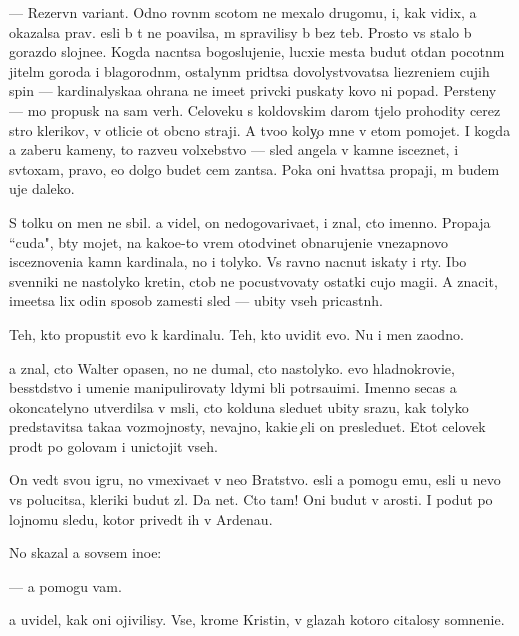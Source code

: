 \documentclass[10pt]{book}
\begin{document}
— Rezervn{\yi}{\y} variant. Odno rovn{\yi}m scotom ne mexalo drugomu, i, kak vidix, {\y}a okazalsa prav. {\Y}esli b{\yi} t{\yi} ne po{\y}avilsa, m{\yi} spravilisy b{\yi} bez teb{\ia}. Prosto vs{\e} stalo b{\yi} gorazdo slojne{\y}e. Kogda nacn{\e}tsa bogoslujeni{\y}e, lucxi{\y}e mesta budut otdan{\yi} pocotn{\yi}m jitel{\ia}m go\-ro\-da i blagorodn{\yi}m, ostalyn{\yi}m prid{\e}tsa dovolystvovatsa li\-{\c}e\-zre\-ni\-{\y}em cujih spin — kardinalyska{\y}a ohrana ne ime{\y}et priv{\yi}cki puskaty kovo ni popad{\ia}. Persteny — mo{\y} propusk na sam{\yi}{\y} verh. Celoveku s koldovskim darom t{\ia}jelo prohodity cerez stro{\y} klerikov, v otlici{\y}e ot ob{\yi}cno{\y} straji. A tvo{\y}o koly{\c}o mne v etom pomojet. I kogda {\y}a zaberu kameny, to razve{\y}u volxebstvo — sled angela v kamne isceznet, i sv{\ia}toxam, pravo, {\y}e{\x}o dolgo budet cem zan{\ia}tsa. Poka oni hvat{\ia}tsa propaji, m{\yi} budem uje daleko.

S tolku on men{\ia} ne sbil. {\Y}a videl, on nedogovariva{\y}et, i znal, cto imenno. Propaja ``cuda", b{\yi}ty mojet, na kako{\y}e-to vrem{\ia} otodvinet obnarujeni{\y}e vnezapnovo iscez\-no\-ve\-ni\-{\y}a kamn{\ia} kardinala, no i tolyko. Vs{\e} ravno nacnut iskaty i r{\yi}ty. Ibo sv{\ia}{\x}enniki ne nastolyko kretin{\yi}, ctob{\yi} ne pocustvovaty ostatki cujo{\y} magi{\y}i. A znacit, ime\-{\y}et\-sa lix odin sposob zamesti sled{\yi} — ubity vseh pricastn{\yi}h.

Teh, kto propustit {\y}evo k kardinalu. Teh, kto uvidit {\y}evo. Nu i men{\ia} zaodno.

{\Y}a znal, cto Walter opasen, no ne dumal, cto nastolyko. {\Y}evo hladnokrovi{\y}e, besst{\yi}dstvo i umeni{\y}e manipulirovaty l{\io}dymi b{\yi}li potr{\ia}sa{\y}u{\x}imi. Imenno se{\y}cas {\y}a okoncatelyno utverdilsa v m{\yi}sli, cto kolduna sledu{\y}et ubity srazu, kak tolyko predstavitsa taka{\y}a vozmojnosty, ne\-vaj\-no, kaki{\y}e {\c}eli on presledu{\y}et. Etot celovek pro{\y}d{\e}t po golovam i unictojit vseh.

On ved{\e}t svo{\y}u igru, no vmexiva{\y}et v ne{\y}o Bratstvo. {\Y}esli {\y}a pomogu {\y}emu, {\y}esli u nevo vs{\e} polucitsa, kleriki budut zl{\yi}. Da net. Cto tam! Oni budut v {\y}arosti. I po{\y}dut po lojnomu sledu, kotor{\yi}{\y} prived{\e}t ih v Ardenau.

No skazal {\y}a sovsem ino{\y}e:

— {\Y}a pomogu vam.

{\Y}a uvidel, kak oni ojivilisy. Vse, krome Kristin{\yi}, v glazah kotoro{\y} citalosy somneni{\y}e.
\end{document}
